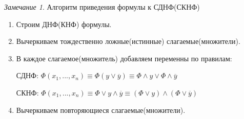 \documentclass[a4paper]{article}
\theoremstyle{definition}
\theoremstyle{remark}
\newtheorem*{remark}{Замечание}
\begin{document}
	\begin{remark}
		Алгоритм приведения формулы к СДНФ(СКНФ)
		\begin{enumerate}
			\item Строим ДНФ(КНФ) формулы.
			\item Вычеркиваем тождественно ложные(истинные) слагаемые(множители).
			\item В каждое слагаемое(множитель) добавляем переменны по правилам:

				СДНФ: $\Phi(x_1, ..., x_n) \equiv \Phi(y \vee \overline{y}) \equiv \Phi \wedge y \vee \Phi \wedge \overline{y}$
				
				СКНФ: $\Phi(x_1, ..., x_n) \equiv \Phi \vee y \wedge \overline{y} \equiv (\Phi \vee y) \wedge (\Phi \vee \overline{y})$
			\item Вычеркиваем повторяющиеся слагаемые(множители).
		\end{enumerate}
	\end{remark}
\end{document}
